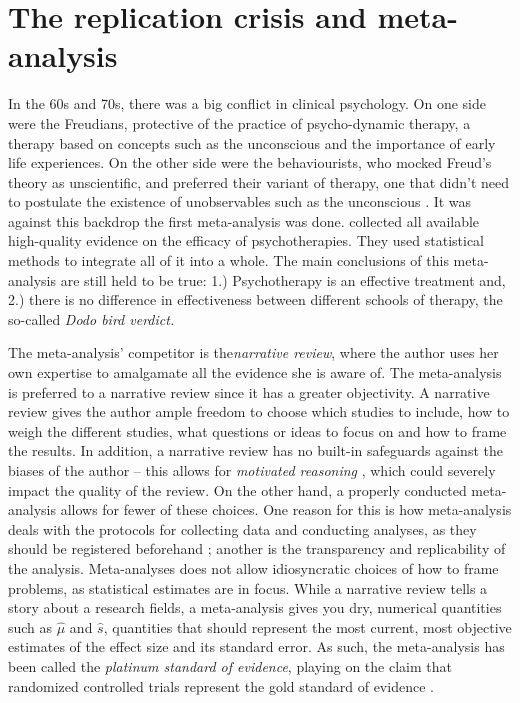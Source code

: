 \section{The replication crisis and meta-analysis}

In the 60s and 70s, there was a big conflict in clinical psychology. On
one side were the Freudians, protective of the practice of psycho-dynamic
therapy, a therapy based on concepts such as the unconscious and the
importance of early life experiences. On the other side were the behaviourists,
who mocked Freud's theory as unscientific, and preferred their variant
of therapy, one that didn't need to postulate the existence of unobservables
such as the unconscious \parencite[Chapter 4]{Wampold2019-fe}. It
was against this backdrop the first meta-analysis was done. \cite{Smith1977-vw}
collected all available high-quality evidence on the efficacy of psychotherapies.
They used statistical methods to integrate all of it into a whole.
The main conclusions of this meta-analysis are still held to be true:
1.) Psychotherapy is an effective treatment and, 2.) there is no difference
in effectiveness between different schools of therapy, the so-called
\emph{Dodo bird verdict.}

The meta-analysis' competitor is the\emph{narrative review}, where
the author uses her own expertise to amalgamate all the evidence she
is aware of. The meta-analysis is preferred to a narrative review
since it has a greater objectivity. A narrative review gives the author
ample freedom to choose which studies to include, how to weigh the
different studies, what questions or ideas to focus on and how to
frame the results. In addition, a narrative review has no built-in
safeguards against the biases of the author -- this allows for \emph{motivated
reasoning }\parencite{Kunda1990-ry}, which could severely impact
the quality of the review. On the other hand, a properly conducted
meta-analysis allows for fewer of these choices. One reason for this
is how meta-analysis deals with the protocols for collecting data
and conducting analyses, as they should be registered beforehand \parencite{Egger1997-ue};
another is the transparency and replicability of the analysis. Meta-analyses
does not allow idiosyncratic choices of how to frame problems, as
statistical estimates are in focus. While a narrative review tells
a story about a research fields, a meta-analysis gives you dry, numerical
quantities such as $\widehat{\mu}$ and $\widehat{s}$, quantities
that should represent the most current, most objective estimates of
the effect size and its standard error. As such, the meta-analysis
has been called the \emph{platinum standard of evidence}, playing
on the claim that randomized controlled trials represent the gold
standard of evidence \parencite{Stegenga2011-zo}.

